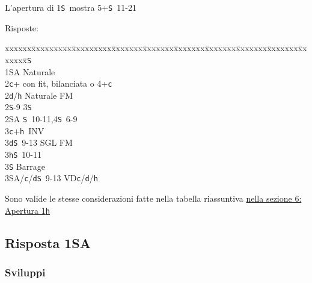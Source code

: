 \documentclass[a4paper,italian]{article}
\newcommand{\BS}{\small{\texttt{S}}}
\newcommand{\BC}{\small{\texttt{c}}}
\newcommand{\BD}{\small{\texttt{d}}}
\newcommand{\BH}{\small{\texttt{h}}}
\newenvironment{bidtable}
{\begin{tabbing}

    xxxxxx\=xxxxxxxxx\=xxxxxxxxx\=xxxxxxx\=xxxxxxx\=xxxxxxx\=xxxxxxx\=xxxxxxx\=xxxxxxx\=xxxxxxx\=\kill}
{\end{tabbing} }%
\begin{document}
\begin{multicols}{2}
    L'apertura di 1\BS\ mostra 5+\BS\ 11-21

    Risposte:
    \begin{bidtable}
        1\BS\+\\
        1\small{SA} \>\> Naturale\\
        2\BC \>+ con fit, bilanciata o 4+\BC \\
        2\BD/\BH \>\> Naturale FM\\
        2\BS \>-9 3\BS \\
        2\small{SA} \>\BS\ 10-11,4\BS\ 6-9\\
        3\BC \>+\BH\ INV\\
        3\BD \>\BS\ 9-13 SGL FM\\
        3\BH \>\BS\ 10-11\\
        3\BS \>\> Barrage\\
        3\small{SA}/\BC/\BD \>\BS\ 9-13 VD\BC /\BD /\BH \-
    \end{bidtable}

    Sono valide le stesse considerazioni fatte nella tabella riassuntiva \hyperref[1Maggiore]{nella sezione 6: Apertura 1\BH}

    \subsection{Risposta 1\small{SA}}

    \subsubsection{Sviluppi}


\end{multicols}
\end{document}
